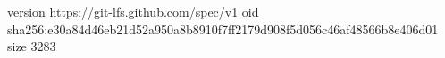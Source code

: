version https://git-lfs.github.com/spec/v1
oid sha256:e30a84d46eb21d52a950a8b8910f7ff2179d908f5d056c46af48566b8e406d01
size 3283
